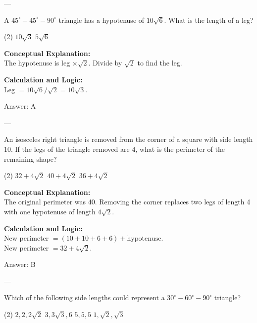\documentclass[11pt,paper=a4,answers]{exam}
\begin{document}
\begin{questions}
---

\question
A $45^\circ-45^\circ-90^\circ$ triangle has a hypotenuse of $10\sqrt{6}$. What is the length of a leg?
\begin{tasks}(2)
    \task $10\sqrt{3}$
    \task $5\sqrt{6}$
\end{tasks}

\begin{solution}
\textbf{Conceptual Explanation:} \\
The hypotenuse is leg $\times \sqrt{2}$. Divide by $\sqrt{2}$ to find the leg.

\vspace{10pt}
\textbf{Calculation and Logic:} \\
Leg $= 10\sqrt{6} / \sqrt{2} = 10\sqrt{3}$.

\vspace{15pt}
Answer: \colorbox{yellow!100}{A}
\end{solution}

---

\question
An isosceles right triangle is removed from the corner of a square with side length 10. If the legs of the triangle removed are 4, what is the perimeter of the remaining shape?
\begin{tasks}(2)
    \task $32 + 4\sqrt{2}$
    \task $40 + 4\sqrt{2}$
    \task $36 + 4\sqrt{2}$
\end{tasks}

\begin{solution}
\textbf{Conceptual Explanation:} \\
The original perimeter was 40. Removing the corner replaces two legs of length 4 with one hypotenuse of length $4\sqrt{2}$.

\vspace{10pt}
\textbf{Calculation and Logic:} \\
New perimeter $= (10 + 10 + 6 + 6) + \text{hypotenuse}$. \\
New perimeter $= 32 + 4\sqrt{2}$.

\vspace{15pt}
Answer: \colorbox{yellow!100}{B}
\end{solution}

---

\question
Which of the following side lengths could represent a $30^\circ-60^\circ-90^\circ$ triangle?
\begin{tasks}(2)
    \task $2, 2, 2\sqrt{2}$
    \task $3, 3\sqrt{3}, 6$
    \task $5, 5, 5$
    \task $1, \sqrt{2}, \sqrt{3}$
\end{tasks}


\end{questions}
\end{document}
